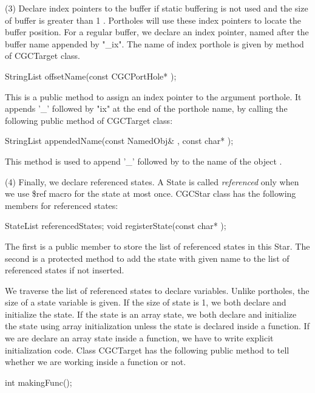 (3) Declare index pointers to the buffer if static buffering
is not used and the size of buffer is greater than 1 . Portholes
will use these index pointers to locate the buffer position. For a regular
buffer, we declare an index pointer, named after the buffer name appended by
"\_ix". The name of index porthole is given by  method 
of CGCTarget class.

\begin{example}
StringList offsetName(const CGCPortHole* );
\end{example}

This is a public method to assign an index pointer to the argument porthole.
It appends '\_' followed by "ix" at the end of the porthole name, by calling
the following public method of CGCTarget class:

\begin{example}
StringList appendedName(const NamedObj& , const char* );
\end{example}

This  method is used to append '\_' followed by
 to the name of the object .

(4) Finally, we declare referenced states. A State is called \emph{referenced}
only when we use \$ref macro for the state at most once. CGCStar class
has the following members for referenced states:

\begin{example}
StateList referencedStates;
void registerState(const char* );
\end{example}

The first is a public member to store the list of referenced states in this
Star. The second is a protected method to add the state with given name to
the list of referenced states if not inserted.

We traverse the list of referenced states to declare variables. Unlike
portholes, the size of a state variable is given. If the size of state is 1,
we both declare and initialize the state. If the state is an array state,
we both declare and initialize the state using array initialization unless
the state is declared inside a function. If we are declare an array state
inside a function, we have to write explicit initialization code.
Class CGCTarget has the following public method to tell whether we are
working inside a function or not.

\begin{example}
int makingFunc();
\end{example}

